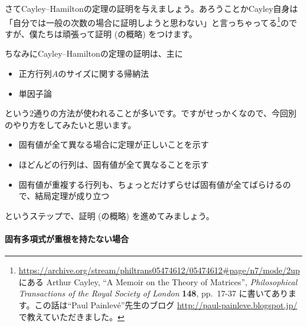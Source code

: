 さてCayley--Hamiltonの定理の証明を与えましょう。あろうことかCayley自身は「自分では一般の次数の場合に証明しようと思わない」と言っちゃってる\footnote{\url{https://archive.org/stream/philtrans05474612/05474612\#page/n7/mode/2up}にある Arthur Cayley, ``A Memoir on the Theory of Matrices'', \textit{Philosophical Transactions of the Royal Society of London} \textbf{148}, pp.~17-37 に書いてあります。この話は``Paul Painlev\'e''先生のブログ \url{http://paul-painleve.blogspot.jp/} で教えていただきました。}のですが、僕たちは頑張って証明 (の概略) をつけます。

ちなみにCayley--Hamiltonの定理の証明は、主に
\begin{itemize}
\item 正方行列$A$のサイズに関する帰納法
\item 単因子論
\end{itemize}
という$2$通りの方法が使われることが多いです。ですがせっかくなので、今回別のやり方をしてみたいと思います。
\begin{itemize}
\item 固有値が全て異なる場合に定理が正しいことを示す
\item ほどんどの行列は、固有値が全て異なることを示す
\item 固有値が重複する行列も、ちょっとだけずらせば固有値が全てばらけるので、結局定理が成り立つ
\end{itemize}
というステップで、証明 (の概略) を進めてみましょう。

\paragraph{固有多項式が重根を持たない場合}

